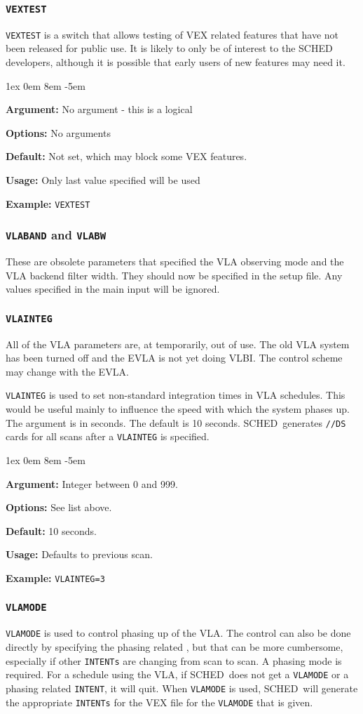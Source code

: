 \documentclass{report}
\newcommand{\schedb}{{\sc SCHED~}}
\newcommand{\rcwbox}[5]{
  \begin{list}{}{\parsep 1ex  \itemsep 0em
                 \leftmargin 8em  \itemindent -5em }
    \item {\bf Argument:} #1
    \item {\bf Options:}  #2
    \item {\bf Default:}  #3
    \item {\bf Usage:}    #4
    \item {\bf Example:}  #5
  \end{list}
}
\begin{document}
\subsubsection{\label{MP:VEXTEST}{\tt VEXTEST}}

{\tt VEXTEST} is a switch that allows testing of VEX related features
that have not been released for public use.  It is likely to only be
of interest to the SCHED developers, although it is possible that
early users of new features may need it.

\rcwbox
{No argument - this is a logical}
{No arguments}
{Not set, which may block some VEX features.}
{Only last value specified will be used}
{{\tt VEXTEST}}

\subsubsection{{\tt VLABAND} and {\tt VLABW}}

These are obsolete parameters that specified the VLA observing mode
and the VLA backend filter width.  They should now be specified in
the setup file.  Any values specified in the main input will be
ignored.


\subsubsection{\label{MP:VLAINTEG}{\tt VLAINTEG}}

All of the VLA parameters are, at temporarily, out of use.  The old
VLA system has been turned off and the EVLA is not yet doing VLBI.
The control scheme may change with the EVLA.

{\tt VLAINTEG} is used to set non-standard integration times in VLA
schedules.  This would be useful mainly to influence the speed with
which the system phases up.  The argument is in seconds.  The default
is 10 seconds.  \schedb generates {\tt //DS} cards for all scans
after a {\tt VLAINTEG} is specified.

\rcwbox
{Integer between 0 and 999.}
{See list above.}
{10 seconds.}
{Defaults to previous scan.}
{{\tt VLAINTEG=3}}


\subsubsection{\label{MP:VLAMODE}{\tt VLAMODE}}

{\tt VLAMODE} is used to control phasing up of the VLA.  The control
can also be done directly by specifying the 
phasing related , but that can
be more cumbersome, especially if other {\tt INTENTs} are changing
from scan to scan.  A phasing mode is required.  For a schedule using
the VLA, if \schedb does not
get a {\tt VLAMODE} or a phasing related {\tt INTENT}, it will quit.
When {\tt VLAMODE} is used, \schedb will 
generate the appropriate {\tt INTENTs} for the VEX file for the {\tt VLAMODE}
that is given.
\end{document}
